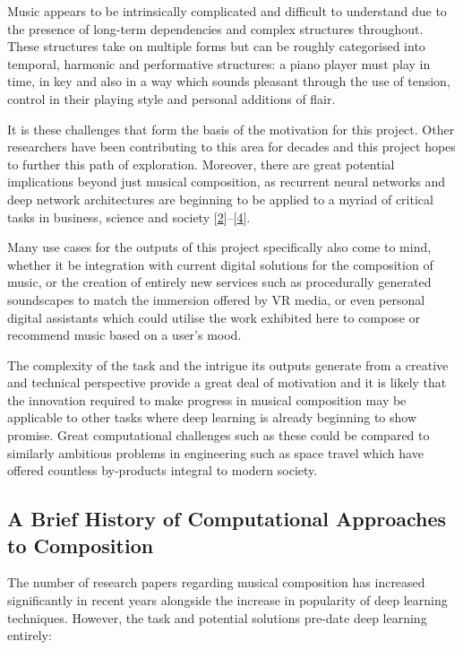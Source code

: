 \documentclass[12pt,]{article}
\begin{document}
Music appears to be intrinsically complicated and difficult to
understand due to the presence of long-term dependencies and complex
structures throughout. These structures take on multiple forms but can
be roughly categorised into temporal, harmonic and performative
structures: a piano player must play in time, in key and also in a way
which sounds pleasant through the use of tension, control in their
playing style and personal additions of flair.

It is these challenges that form the basis of the motivation for this
project. Other researchers have been contributing to this area for
decades and this project hopes to further this path of exploration.
Moreover, there are great potential implications beyond just musical
composition, as recurrent neural networks and deep network architectures
are beginning to be applied to a myriad of critical tasks in business,
science and society
{[}\protect\hyperlink{ref-deng2014deep}{2}{]}--{[}\protect\hyperlink{ref-goodfellow2016deep}{4}{]}.

Many use cases for the outputs of this project specifically also come to
mind, whether it be integration with current digital solutions for the
composition of music, or the creation of entirely new services such as
procedurally generated soundscapes to match the immersion offered by VR
media, or even personal digital assistants which could utilise the work
exhibited here to compose or recommend music based on a user's mood.

The complexity of the task and the intrigue its outputs generate from a
creative and technical perspective provide a great deal of motivation
and it is likely that the innovation required to make progress in
musical composition may be applicable to other tasks where deep learning
is already beginning to show promise. Great computational challenges
such as these could be compared to similarly ambitious problems in
engineering such as space travel which have offered countless
by-products integral to modern society.

\hypertarget{a-brief-history-of-computational-approaches-to-composition}{%
\subsection{A Brief History of Computational Approaches to
Composition}\label{a-brief-history-of-computational-approaches-to-composition}}

The number of research papers regarding musical composition has
increased significantly in recent years alongside the increase in
popularity of deep learning techniques. However, the task and potential
solutions pre-date deep learning entirely:
\end{document}
